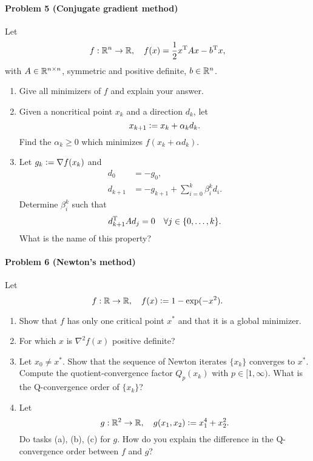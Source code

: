 \paragraph{Problem 5 (Conjugate gradient method)}
Let
\[
    f: \mathbb{R}^n \to \mathbb{R},\quad f(x) = \frac{1}{2} x^{\text{\upshape T}} A x - b^{\text{\upshape T}} x,
\]
with $A\in\mathbb{R}^{n\times n}$, symmetric and positive definite, $b\in\mathbb{R}^n$.

\begin{enumerate}
  \item Give all minimizers of $f$ and explain your answer.
  \item Given a noncritical point $x_k$ and a direction $d_k$, let
    \[
      x_{k+1} \mathrel{\mathop:}= x_k + \alpha_k d_k.
    \]
    Find the $\alpha_k\ge 0$ which minimizes $f(x_{k}+\alpha d_k)$.
  \item Let $g_k\mathrel{\mathop:}= \nabla f(x_k)$ and
    \[
      \begin{split}
        d_0 &= -g_0,\\
        d_{k+1} &= -g_{k+1} + \sum_{i=0}^k \beta_i^{k} d_i.
      \end{split}
    \]
    Determine $\beta_i^k$ such that
    \[
      d_{k+1}^{\text{\upshape T}} A d_j = 0 \quad\forall j\in\{0,\dots,k\}.
    \]
    What is the name of this property?
\end{enumerate}
\paragraph{Problem 6 (Newton's method)}

Let
\[
  f: \mathbb{R} \to \mathbb{R},\quad f(x) \mathrel{\mathop:}= 1 - \exp(-x^2).
\]

\begin{enumerate}

\item Show that $f$ has only one critical point $x^*$ and that it is a global
  minimizer.

\item For which $x$ is $\nabla^2 f(x)$ positive definite?

\item Let $x_0\neq x^*$. Show that the sequence of Newton iterates
  $\{x_k\}$ converges to $x^*$. Compute the quotient-convergence factor
  $Q_p(x_k)$ with $p\in[1,\infty)$.  What is the Q-convergence order of
    $\{x_k\}$?

  \item Let
    \[
       g: \mathbb{R}^2 \to \mathbb{R},\quad g(x_1, x_2) \mathrel{\mathop:}= x_1^4 + x_2^2.
    \]
    Do tasks (a), (b), (c) for $g$.
 How do you explain the difference in the Q-convergence order between $f$ and $g$?
\end{enumerate}
